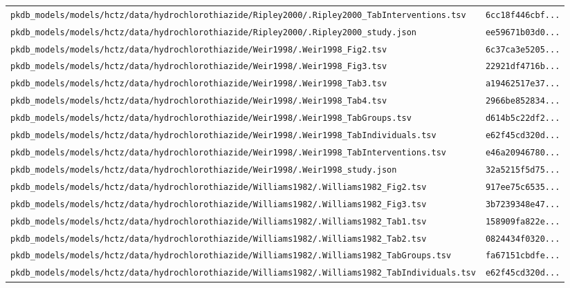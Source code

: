 \begin{longtable}{ll}
\texttt{pkdb\_models/models/hctz/data/hydrochlorothiazide/Ripley2000/.Ripley2000\_TabInterventions.tsv} & \texttt{6cc18f446cbf...} \\
\texttt{pkdb\_models/models/hctz/data/hydrochlorothiazide/Ripley2000/.Ripley2000\_study.json} & \texttt{ee59671b03d0...} \\
\texttt{pkdb\_models/models/hctz/data/hydrochlorothiazide/Weir1998/.Weir1998\_Fig2.tsv} & \texttt{6c37ca3e5205...} \\
\texttt{pkdb\_models/models/hctz/data/hydrochlorothiazide/Weir1998/.Weir1998\_Fig3.tsv} & \texttt{22921df4716b...} \\
\texttt{pkdb\_models/models/hctz/data/hydrochlorothiazide/Weir1998/.Weir1998\_Tab3.tsv} & \texttt{a19462517e37...} \\
\texttt{pkdb\_models/models/hctz/data/hydrochlorothiazide/Weir1998/.Weir1998\_Tab4.tsv} & \texttt{2966be852834...} \\
\texttt{pkdb\_models/models/hctz/data/hydrochlorothiazide/Weir1998/.Weir1998\_TabGroups.tsv} & \texttt{d614b5c22df2...} \\
\texttt{pkdb\_models/models/hctz/data/hydrochlorothiazide/Weir1998/.Weir1998\_TabIndividuals.tsv} & \texttt{e62f45cd320d...} \\
\texttt{pkdb\_models/models/hctz/data/hydrochlorothiazide/Weir1998/.Weir1998\_TabInterventions.tsv} & \texttt{e46a20946780...} \\
\texttt{pkdb\_models/models/hctz/data/hydrochlorothiazide/Weir1998/.Weir1998\_study.json} & \texttt{32a5215f5d75...} \\
\texttt{pkdb\_models/models/hctz/data/hydrochlorothiazide/Williams1982/.Williams1982\_Fig2.tsv} & \texttt{917ee75c6535...} \\
\texttt{pkdb\_models/models/hctz/data/hydrochlorothiazide/Williams1982/.Williams1982\_Fig3.tsv} & \texttt{3b7239348e47...} \\
\texttt{pkdb\_models/models/hctz/data/hydrochlorothiazide/Williams1982/.Williams1982\_Tab1.tsv} & \texttt{158909fa822e...} \\
\texttt{pkdb\_models/models/hctz/data/hydrochlorothiazide/Williams1982/.Williams1982\_Tab2.tsv} & \texttt{0824434f0320...} \\
\texttt{pkdb\_models/models/hctz/data/hydrochlorothiazide/Williams1982/.Williams1982\_TabGroups.tsv} & \texttt{fa67151cbdfe...} \\
\texttt{pkdb\_models/models/hctz/data/hydrochlorothiazide/Williams1982/.Williams1982\_TabIndividuals.tsv} & \texttt{e62f45cd320d...} \\

\end{longtable}
